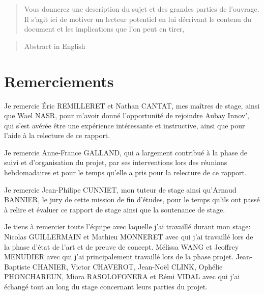 \documentclass[11pt]{article}
\begin{document}
  \begin{abstract}
    Vous donnerez une description du
    sujet et des grandes parties de l’ouvrage. Il s’agit ici de motiver un lecteur potentiel en lui
    décrivant le contenu du document et les implications que l’on peut en tirer,
  \end{abstract}
  \pagebreak

  \begin{abstract}
    Abstract in English
  \end{abstract}
  \pagebreak

  \setcounter{tocdepth}{5}
  \tableofcontents

  \pagebreak

  \section{Remerciements}  
    
    Je remercie Éric REMILLERET et Nathan CANTAT, mes maîtres de stage, 
    ainsi que Wael NASR, pour m'avoir donné l'opportunité de rejoindre 
    Aubay Innov', qui s'est avérée être une expérience intéressante 
    et instructive, ainsi que pour l'aide à la relecture de ce rapport.    
    
    Je remercie Anne-France GALLAND, qui a largement contribué à la phase de suivi et d'organisation du projet, par ses interventions 
    lors des réunions hebdomadaires et pour le temps qu'elle a pris pour la relecture de ce rapport.    
    
    Je remercie Jean-Philipe CUNNIET, mon tuteur de stage ainsi qu'Arnaud BANNIER, le jury de cette mission de fin d'études, 
    pour le temps qu'ils ont passé à relire et évaluer ce rapport de stage ainsi que la soutenance de stage.    

    Je tiens à remercier toute l'équipe avec laquelle j'ai 
    travaillé durant mon stage:    
    Nicolas GUILLERMAIN et Mathieu MONNERET avec qui j'ai travaillé lors 
    de la phase d'état de l'art et de preuve de concept.
    Mélissa WANG et Jeoffrey MENUDIER avec qui j'ai principalement 
    travaillé lors de la phase projet. 
    Jean-Baptiste CHANIER, Victor CHAVEROT, Jean-Noël CLINK,
    Ophélie PHONCHAREUN, Miora RASOLOFONERA et Rémi VIDAL avec qui j'ai échangé tout au 
    long du stage concernant leurs parties du projet.       
    
\end{document}
